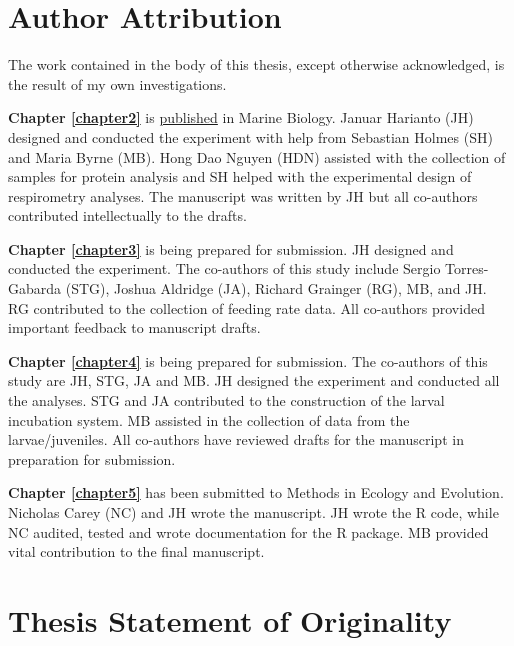 \SingleSpacing


\section*{Author Attribution}

The work contained in the body of this thesis, except otherwise acknowledged, is the result of my own investigations. 

\textbf{Chapter \ref{chapter2}} is \href{https://doi.org/10/gdqdv4}{published} in Marine Biology. Januar Harianto (JH) designed and conducted the experiment with help from Sebastian Holmes (SH) and Maria Byrne (MB). Hong Dao Nguyen (HDN) assisted with the collection of samples for protein analysis and SH helped with the experimental design of respirometry analyses. The manuscript was written by JH but all co-authors contributed intellectually to the drafts.

\textbf{Chapter \ref{chapter3}} is being prepared for submission. JH designed and conducted the experiment. The co-authors of this study include Sergio Torres-Gabarda (STG), Joshua Aldridge (JA), Richard Grainger (RG), MB, and JH. RG contributed to the collection of feeding rate data. All co-authors provided important feedback to manuscript drafts.

\textbf{Chapter \ref{chapter4}} is being prepared for submission. The co-authors of this study are JH, STG, JA and MB. JH designed the experiment and conducted all the analyses. STG and JA contributed to the construction of the larval incubation system. MB assisted in the collection of data from the larvae/juveniles. All co-authors have reviewed drafts for the manuscript in preparation for submission.

\textbf{Chapter \ref{chapter5}} has been submitted to Methods in Ecology and Evolution. Nicholas Carey (NC) and JH wrote the manuscript. JH wrote the R code, while NC audited, tested and wrote documentation for the R package. MB provided vital contribution to the final manuscript.

\vfill
\hrulefill


\section*{Thesis Statement of Originality}

